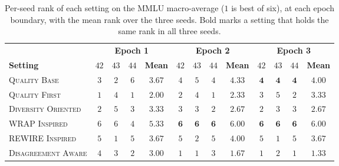 \begin{table}[t]
\centering
\caption{Per-seed rank of each setting on the MMLU macro-average ($1$ is best of six), at each epoch boundary, with the mean rank over the three seeds. Bold marks a setting that holds the same rank in all three seeds.}
\label{tab:ranks-mmlu}
\footnotesize
\setlength{\tabcolsep}{3.5pt}
\renewcommand{\arraystretch}{1.15}

\begin{tabular}{lcccccccccccc}
\toprule
& \multicolumn{4}{c}{\textbf{Epoch 1}} & \multicolumn{4}{c}{\textbf{Epoch 2}} & \multicolumn{4}{c}{\textbf{Epoch 3}} \\
\cmidrule(lr){2-5}\cmidrule(lr){6-9}\cmidrule(lr){10-13}
\textbf{Setting} & $42$ & $43$ & $44$ & \textbf{Mean} & $42$ & $43$ & $44$ & \textbf{Mean} & $42$ & $43$ & $44$ & \textbf{Mean} \\
\midrule
\textsc{Quality Base} & $3$ & $2$ & $6$ & $3.67$ & $4$ & $5$ & $4$ & $4.33$ & $\mathbf{4}$ & $\mathbf{4}$ & $\mathbf{4}$ & $4.00$ \\
\midrule
\textsc{Quality First} & $1$ & $4$ & $1$ & $2.00$ & $2$ & $4$ & $1$ & $2.33$ & $3$ & $5$ & $2$ & $3.33$ \\
\textsc{Diversity Oriented} & $2$ & $5$ & $3$ & $3.33$ & $3$ & $3$ & $2$ & $2.67$ & $2$ & $3$ & $3$ & $2.67$ \\
\textsc{WRAP Inspired} & $6$ & $6$ & $4$ & $5.33$ & $\mathbf{6}$ & $\mathbf{6}$ & $\mathbf{6}$ & $6.00$ & $\mathbf{6}$ & $\mathbf{6}$ & $\mathbf{6}$ & $6.00$ \\
\textsc{REWIRE Inspired} & $5$ & $1$ & $5$ & $3.67$ & $5$ & $2$ & $5$ & $4.00$ & $5$ & $1$ & $5$ & $3.67$ \\
\textsc{Disagreement Aware} & $4$ & $3$ & $2$ & $3.00$ & $1$ & $1$ & $3$ & $1.67$ & $1$ & $2$ & $1$ & $1.33$ \\
\bottomrule
\end{tabular}
\end{table}

